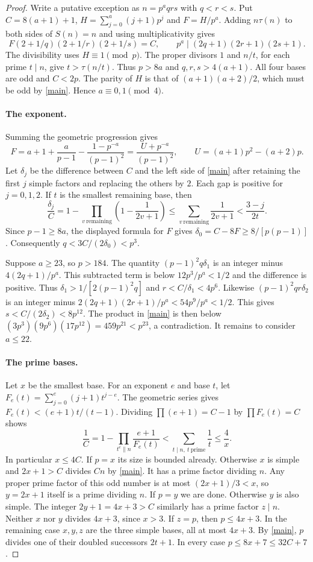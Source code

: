 \documentclass[11pt]{article}
\begin{document}
\begin{proof}
Write a putative exception as $n=p^a qrs$ with $q<r<s$. Put $C=8(a+1)+1$, $H=\sum_{j=0}^a(j+1)p^j$ and $F=H/p^a$. Adding $n\tau(n)$ to both sides of $S(n)=n$ and using multiplicativity gives
\begin{equation}\label{main}
 F(2+1/q)(2+1/r)(2+1/s)=C,\qquad p^a\mid(2q+1)(2r+1)(2s+1).
\end{equation}
The divisibility uses $H\equiv1\pmod p$. The proper divisors $1$ and $n/t$, for each prime $t\mid n$, give $t>\tau(n/t)$. Thus $p>8a$ and $q,r,s>4(a+1)$. All four bases are odd and $C<2p$. The parity of $H$ is that of $(a+1)(a+2)/2$, which must be odd by \eqref{main}. Hence $a\equiv0,1\pmod4$.

\paragraph{The exponent.} Summing the geometric progression gives
\[
 F=a+1+\frac a{p-1}-\frac{1-p^{-a}}{(p-1)^2}
   =\frac{U+p^{-a}}{(p-1)^2},\qquad U=(a+1)p^2-(a+2)p.
\]
Let $\delta_j$ be the difference between $C$ and the left side of \eqref{main} after retaining the first $j$ simple factors and replacing the others by $2$. Each gap is positive for $j=0,1,2$. If $t$ is the smallest remaining base, then
\[
 \frac{\delta_j}{C}=1-\prod_{v\ \mathrm{remaining}}\left(1-\frac{1}{2v+1}\right)
 \le \sum_{v\ \mathrm{remaining}}\frac1{2v+1}<\frac{3-j}{2t}.
\]
Since $p-1\ge8a$, the displayed formula for $F$ gives $\delta_0=C-8F\ge8/[p(p-1)]$. Consequently $q<3C/(2\delta_0)<p^3$.

Suppose $a\ge23$, so $p>184$. The quantity $(p-1)^2q\delta_1$ is an integer minus $4(2q+1)/p^a$. This subtracted term is below $12p^3/p^a<1/2$ and the difference is positive. Thus $\delta_1>1/[2(p-1)^2q]$ and $r<C/\delta_1<4p^6$. Likewise $(p-1)^2qr\delta_2$ is an integer minus $2(2q+1)(2r+1)/p^a<54p^9/p^a<1/2$. This gives $s<C/(2\delta_2)<8p^{12}$. The product in \eqref{main} is then below $(3p^3)(9p^6)(17p^{12})=459p^{21}<p^{23}$, a contradiction. It remains to consider $a\le22$.

\paragraph{The prime bases.} Let $x$ be the smallest base. For an exponent $e$ and base $t$, let $F_e(t)=\sum_{j=0}^e(j+1)t^{j-e}$. The geometric series gives $F_e(t)<(e+1)t/(t-1)$. Dividing $\prod(e+1)=C-1$ by $\prod F_e(t)=C$ shows
\[
 \frac1C=1-\prod_{t^e\parallel n}\frac{e+1}{F_e(t)}<\sum_{t\mid n,\ t\ \mathrm{prime}}\frac1t\le\frac4x.
\]
In particular $x\le4C$. If $p=x$ its size is bounded already. Otherwise $x$ is simple and $2x+1>C$ divides $Cn$ by \eqref{main}. It has a prime factor dividing $n$. Any proper prime factor of this odd number is at most $(2x+1)/3<x$, so $y=2x+1$ itself is a prime dividing $n$. If $p=y$ we are done. Otherwise $y$ is also simple. The integer $2y+1=4x+3>C$ similarly has a prime factor $z\mid n$. Neither $x$ nor $y$ divides $4x+3$, since $x>3$. If $z=p$, then $p\le4x+3$. In the remaining case $x,y,z$ are the three simple bases, all at most $4x+3$. By \eqref{main}, $p$ divides one of their doubled successors $2t+1$. In every case $p\le8x+7\le32C+7$.


\end{proof}
\end{document}
